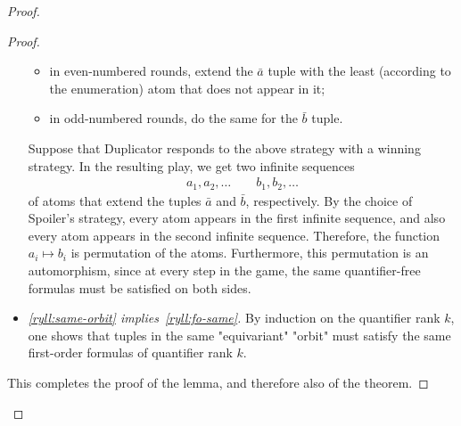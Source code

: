 \begin{proof}
\begin{proof}
\begin{itemize}
			 \begin{itemize}
				 \item in even-numbered rounds, extend the $\bar a$ tuple with the least (according to the enumeration) atom that does not appear in it;
				 \item in odd-numbered rounds, do the same for the $\bar b$ tuple.
			 \end{itemize}
			 Suppose that Duplicator responds to the above strategy with a winning strategy. In the resulting play, we get two infinite sequences
			\begin{align*}
				a_1,a_2,\ldots \qquad b_1,b_2,\ldots
			\end{align*}
			of atoms that extend the tuples $\bar a$ and $\bar b$, respectively. By the choice of Spoiler's strategy, every atom appears in the first infinite  sequence, and also every atom  appears in the second infinite sequence.  Therefore, the function $a_i \mapsto b_i$ is permutation of the atoms. Furthermore, this permutation is an automorphism, since at every step in the game, the same quantifier-free formulas must be satisfied on both sides. 
			\item \emph{\ref{ryll:same-orbit} implies~\ref{ryll:fo-same}.} By induction on the quantifier rank $k$, one shows that tuples in the same "equivariant" "orbit" must satisfy the same first-order formulas of quantifier rank $k$. 
			
		\end{itemize}
		
This completes the proof of the lemma, and therefore also of the theorem.
	\end{proof}
\end{proof}



